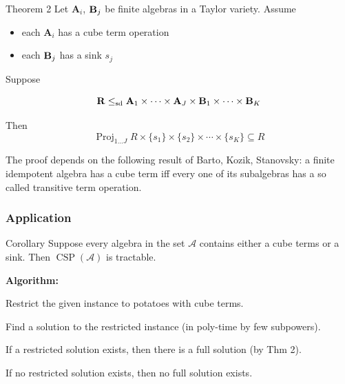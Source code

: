 \documentclass[10pt,xcolor=dvipsnames%
   ]{beamer}
\newcommand{\Proj}{\ensuremath{\operatorname{Proj}}}
\DeclareMathOperator{\CSP}{CSP}
\renewcommand{\.}{\cdot}
\newcommand{\sA}{\ensuremath{\mathcal{A}}}
\newcommand{\bA}{\ensuremath{\mathbf{A}}}
\newcommand{\bR}{\ensuremath{\mathbf{R}}}
\begin{document}
\begin{frame}

  \newcommand{\kk}{\ensuremath{\underline{k}}}
\newcommand{\sdp}{\ensuremath{\leq_{\mathrm{sd}}}}
    
\begin{exampleblock}{Theorem 2}
Let $\bA_i$, $\mathbf{B}_j$ be finite algebras in a Taylor variety. Assume

\begin{itemize}
\item 
each $\bA_i$ has a \alert{cube term} operation

\item
each $\mathbf{B}_j$ has a \alert{sink} $s_j$
\end{itemize}

Suppose

  \[
  \bR \sdp \bA_1 \times \cdots \times \bA_J \times \bB_1 \times \cdots \times \bB_K
  \]

  Then
  \[
  \Proj_{1 \dots J}R \times \{s_1\} \times \{s_2\} \times \cdots \times \{s_K\}  \subseteq R
  \]
\end{exampleblock}

\pause

The proof depends on the following result of Barto, Kozik, Stanovsky: a finite idempotent
algebra has a cube term iff every one of its subalgebras has a so called \alert{transitive term
operation}. 
\end{frame}

\begin{frame}
  \frametitle{Application}

  \begin{exampleblock}{Corollary}
  Suppose every algebra in the set $\sA$ contains either a cube terms
  or a sink. Then $\CSP(\sA)$ is tractable.
  \end{exampleblock}
      {\bf Algorithm:}

      Restrict the given instance to potatoes with cube terms.

      Find a solution to the restricted instance (in poly-time by few subpowers).

      If a restricted solution exists, then there is a full solution (by Thm 2).

      If no restricted solution exists, then no full solution exists.
\end{frame}
\end{document}
